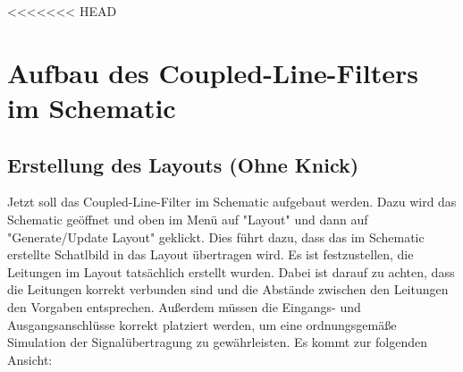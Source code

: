 <<<<<<< HEAD
\section{Aufbau des Coupled-Line-Filters im Schematic}
\subsection{Erstellung des Layouts (Ohne Knick)}
Jetzt soll das Coupled-Line-Filter im Schematic aufgebaut werden. Dazu wird das Schematic geöffnet und oben im Menü auf "Layout" und dann auf "Generate/Update Layout" geklickt. Dies führt dazu, dass das im Schematic erstellte Schatlbild in das Layout übertragen wird. Es ist festzustellen, die Leitungen im Layout tatsächlich erstellt wurden. Dabei ist darauf zu achten, dass die Leitungen korrekt verbunden sind und die Abstände zwischen den Leitungen den Vorgaben entsprechen. Außerdem müssen die Eingangs- und Ausgangsanschlüsse korrekt platziert werden, um eine ordnungsgemäße Simulation der Signalübertragung zu gewährleisten.
Es kommt zur folgenden Ansicht:

